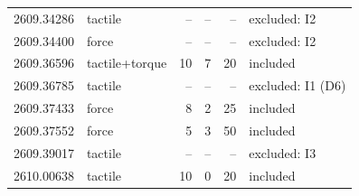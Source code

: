 \begin{longtable}{@{}llrrrl@{}}
2609.34286 & tactile & -- & -- & -- & excluded: I2 \\
2609.34400 & force & -- & -- & -- & excluded: I2 \\
2609.36596 & tactile+torque & 10 & 7 & 20 & included \\
2609.36785 & tactile & -- & -- & -- & excluded: I1 (D6) \\
2609.37433 & force & 8 & 2 & 25 & included \\
2609.37552 & force & 5 & 3 & 50 & included \\
2609.39017 & tactile & -- & -- & -- & excluded: I3 \\
2610.00638 & tactile & 10 & 0 & 20 & included \\
\end{longtable}
